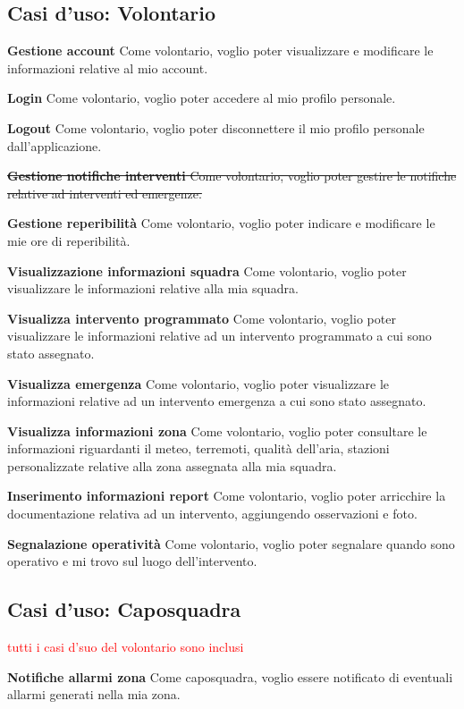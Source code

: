 \subsection{Casi d'uso: Volontario}
\textbf{Gestione account}
Come volontario, voglio poter visualizzare e modificare le informazioni relative al mio account.

\textbf{Login}
Come volontario, voglio poter accedere al mio profilo personale.

\textbf{Logout}
Come volontario, voglio poter disconnettere il mio profilo personale dall'applicazione.

\sout{\textbf{Gestione notifiche interventi}
Come volontario, voglio poter gestire le notifiche relative ad interventi ed emergenze.}

\textbf{Gestione reperibilità}
Come volontario, voglio poter indicare e modificare le mie ore di reperibilità.

\textbf{Visualizzazione informazioni squadra}
Come volontario, voglio poter visualizzare le informazioni relative alla mia squadra.

\textbf{Visualizza intervento programmato}
Come volontario, voglio poter visualizzare le informazioni relative ad un intervento programmato a cui sono stato assegnato.

\textbf{Visualizza emergenza}
Come volontario, voglio poter visualizzare le informazioni relative ad un intervento emergenza a cui sono stato assegnato.

\textbf{Visualizza informazioni zona}
Come volontario, voglio poter consultare le informazioni riguardanti il meteo, terremoti, qualità dell'aria, stazioni personalizzate relative alla zona assegnata alla mia squadra.

\textbf{Inserimento informazioni report}
Come volontario, voglio poter arricchire la documentazione relativa ad un intervento, aggiungendo osservazioni e foto.

\textbf{Segnalazione operatività}
Come volontario, voglio poter segnalare quando sono operativo e mi trovo sul luogo dell'intervento.


\subsection{Casi d'uso: Caposquadra}

\textcolor{red}{tutti i casi d'suo del volontario sono inclusi}

\textbf{Notifiche allarmi zona}
Come caposquadra, voglio essere notificato di eventuali allarmi generati nella mia zona.

